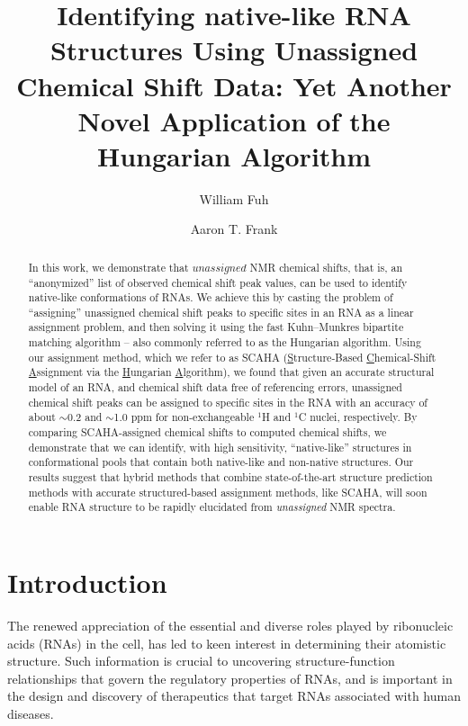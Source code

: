 \documentclass[journal=jcisd8,manuscript=article,layout=onecolumn]{achemso}
\author{William Fuh}
\author{Aaron T. Frank}
\affiliation{Departments of Biophysics and Chemistry, University of Michigan, 930 North University Avenue, Ann Arbor, Michigan 48109, USA}
\title[Title]
 {Identifying native-like RNA Structures Using Unassigned Chemical Shift Data: Yet Another Novel Application of the Hungarian Algorithm}
\begin{document}
\begin{abstract}
In this work, we demonstrate that $\textit{unassigned}$ NMR chemical shifts, that is, an  ``anonymized'' list of observed chemical shift peak values, can be used to identify native-like conformations of RNAs.  We achieve this by casting the problem of ``assigning''  unassigned chemical shift peaks to specific sites in an RNA as a linear assignment problem, and then solving it using the fast Kuhn--Munkres  bipartite matching algorithm -- also commonly referred to as the Hungarian algorithm. Using our assignment method, which we refer to as SCAHA (\underline{S}tructure-Based \underline{C}hemical-Shift \underline{A}ssignment via the \underline{H}ungarian \underline{A}lgorithm), we found that given an accurate structural model of an RNA, and chemical shift data free of referencing errors, unassigned chemical shift peaks can be assigned to specific sites in the RNA with an accuracy of about $\sim$0.2 and $\sim$1.0 ppm for non-exchangeable $^{1}$H and  $^{1}$C nuclei, respectively.  By comparing SCAHA-assigned chemical shifts to computed chemical shifts, we demonstrate that we can identify, with high sensitivity, “native-like” structures in conformational pools that contain both native-like and non-native structures. Our results suggest that hybrid methods that combine state-of-the-art structure prediction methods with accurate structured-based assignment methods, like SCAHA,  will soon enable RNA structure to be rapidly elucidated from \textit{unassigned} NMR spectra.
\end{abstract}
 
\section{Introduction}
The renewed appreciation of the essential and diverse roles played by ribonucleic acids (RNAs) in the cell\cite{encode2012integrated}, has led to keen interest in determining their atomistic structure. Such information is crucial to uncovering structure-function relationships that govern the regulatory properties of RNAs, and is important in the design and discovery of therapeutics that target RNAs associated with human diseases\cite{cooper2009rna}. 
\end{document}
